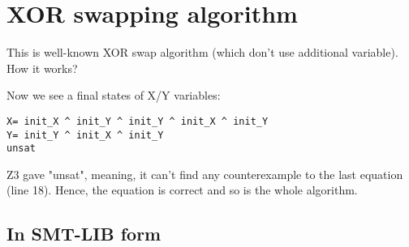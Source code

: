 \section{XOR swapping algorithm}

This is well-known XOR swap algorithm (which don't use additional variable).
How it works?



Now we see a final states of X/Y variables:

\begin{lstlisting}
X= init_X ^ init_Y ^ init_Y ^ init_X ^ init_Y
Y= init_Y ^ init_X ^ init_Y
unsat
\end{lstlisting}

Z3 gave "unsat", meaning, it can't find any counterexample to the last equation (line 18).
Hence, the equation is correct and so is the whole algorithm.

\subsection{In SMT-LIB form}





